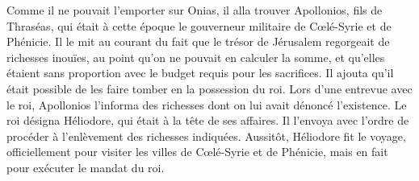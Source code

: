 Comme il ne pouvait l’emporter sur Onias,
	il alla trouver Apollonios, fils de Thraséas,
	qui était à cette époque le gouverneur militaire de Cœlé-Syrie et de Phénicie.
Il le mit au courant du fait que le trésor de Jérusalem regorgeait de richesses inouïes,
	au point qu’on ne pouvait en calculer la somme,
	et qu’elles étaient sans proportion avec le budget requis pour les sacrifices.
Il ajouta qu’il était possible de les faire tomber en la possession du roi.
Lors d’une entrevue avec le roi,
	Apollonios l’informa des richesses dont on lui avait dénoncé l’existence.
Le roi désigna Héliodore, qui était à la tête de ses affaires.
	Il l’envoya avec l’ordre de procéder à l’enlèvement des richesses indiquées.
Aussitôt, Héliodore fit le voyage,
	officiellement pour visiter les villes de Cœlé-Syrie et de Phénicie,
	mais en fait pour exécuter le mandat du roi.
